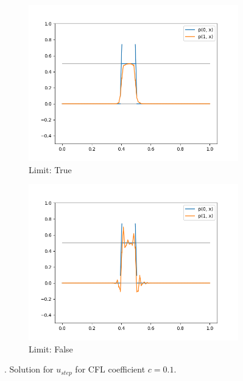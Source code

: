 \begin{figure}[h!]
	\centering
	\begin{subfigure}{.5\textwidth}	
		\centering	
		\includegraphics[width=\linewidth]{../figs/sols/adv1d-sol-o2h100-limit}
		\caption{Limit: True}
	\end{subfigure}%
	\begin{subfigure}{.5\textwidth}
		\centering	
		\includegraphics[width=\linewidth]{../figs/sols/adv1d-sol-o2h100-nolimit}
		\caption{Limit: False}
	\end{subfigure}
	\caption{. Solution for $u_{step}$ for CFL coefficient $c=0.1$.}
	\label{fig:sol_adv1D} 
\end{figure}

